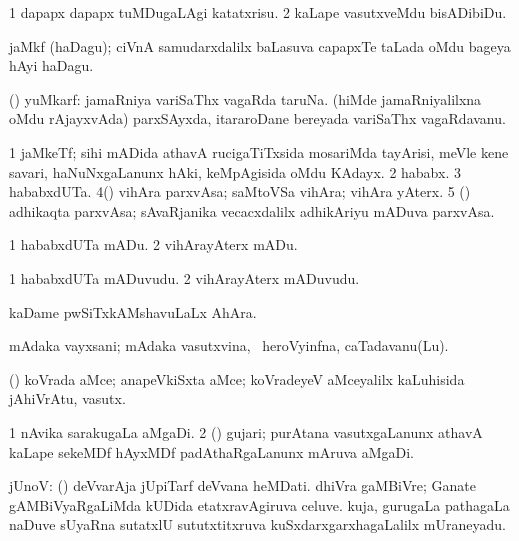 \bentry
{}
\gl{\sakirx}
\bmng
\bnum
\num{1} dapapx dapapx tuMDugaLAgi katatxrisu. 
\num{2} kaLape vasutxveMdu bisADibiDu. 
\enum
\emng
\eentry

\bentry
{}
\gl{\nA}
\bmng
jaMkf (haDagu); ciVnA samudarxdalilx baLasuva capapxTe taLada oMdu bageya hAyi haDagu.   
\emng
\eentry

\bentry
{}
\gl{\nA}
\expl{\G}
\bmng
(\ca) yuMkarf: 
\banum
{} jamaRniya variSaThx vagaRda taruNa. 
 (hiMde jamaRniyalilxna oMdu rAjayxvAda) parxSAyxda, itararoDane bereyada variSaThx vagaRdavanu. 
\eanum
\emng
\eentry

\bentry
{}
\gl{\nA}
\bmng
\bnum
\num{1} jaMkeTf; sihi mADida athavA rucigaTiTxsida mosariMda tayArisi, meVle kene savari, haNuNxgaLanunx hAki, keMpAgisida oMdu KAdayx. 
\num{2} hababx. 
\num{3} hababxdUTa. 
\num{4}(\ame) vihAra parxvAsa; saMtoVSa vihAra; vihAra yAterx. 
\num{5} (\ame) adhikaqta parxvAsa; sAvaRjanika vecacxdalilx adhikAriyu mADuva parxvAsa. 
\enum
\emng
\eentry

\bentry
{}
\gl{\akirx}
\bmng
\bnum
\num{1} hababxdUTa mADu. 
\num{2} vihArayAterx mADu. 
\enum
\emng
\eentry

\bentry
{}
\gl{\nA}
\bmng
\bnum
\num{1} hababxdUTa mADuvudu. 
\num{2} vihArayAterx mADuvudu. 
\enum
\emng
\eentry

\bentry
{}
\gl{\nA}
\bmng
kaDame pwSiTxkAMshavuLaLx AhAra. 
\emng
\eentry

\bentry
{}
\gl{\nA}
\bmng
mAdaka vayxsani; mAdaka vasutxvina, \kanmu\ heroVyinfna, caTadavanu(Lu). 
\emng
\eentry

\bentry
{}
\gl{\nA}
\bmng
(\ame) koVrada aMce; anapeVkiSxta aMce; koVradeyeV aMceyalilx kaLuhisida jAhiVrAtu, vasutx. 
\emng
\eentry

\bentry
{}
\gl{\nA}
\bmng
\bnum
\num{1} nAvika sarakugaLa aMgaDi. 
\num{2} (\hiV) gujari; purAtana vasutxgaLanunx athavA kaLape sekeMDf hAyxMDf padAthaRgaLanunx mAruva aMgaDi. 
\enum
\emng
\eentry

\bentry
{}
\gl{\nA}
\bmng
jUnoV: 
\banum
{} (\roVpu) deVvarAja jUpiTarf deVvana heMDati. 
 dhiVra gaMBiVre; Ganate gAMBiVyaRgaLiMda kUDida etatxravAgiruva celuve. 
 kuja, gurugaLa pathagaLa naDuve sUyaRna sutatxlU sututxtitxruva kuSxdarxgarxhagaLalilx mUraneyadu. 
\eanum
\emng
\eentry

